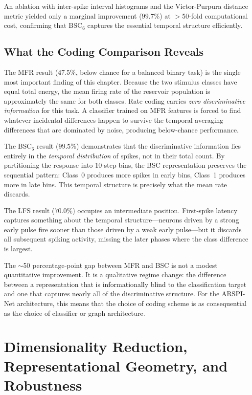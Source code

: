 An ablation with inter-spike interval histograms and the Victor-Purpura distance metric \cite{victor_purpura_1996} yielded only a marginal improvement ($99.7\%$) at $>$50-fold computational cost, confirming that BSC$_6$ captures the essential temporal structure efficiently.

\subsection{What the Coding Comparison Reveals}

The MFR result ($47.5\%$, below chance for a balanced binary task) is the single most important finding of this chapter. Because the two stimulus classes have equal total energy, the mean firing rate of the reservoir population is approximately the same for both classes. Rate coding carries \emph{zero discriminative information} for this task. A classifier trained on MFR features is forced to find whatever incidental differences happen to survive the temporal averaging---differences that are dominated by noise, producing below-chance performance.

The BSC$_6$ result ($99.5\%$) demonstrates that the discriminative information lies entirely in the \emph{temporal distribution} of spikes, not in their total count. By partitioning the response into 10-step bins, the BSC representation preserves the sequential pattern: Class~0 produces more spikes in early bins, Class~1 produces more in late bins. This temporal structure is precisely what the mean rate discards.

The LFS result ($70.0\%$) occupies an intermediate position. First-spike latency captures something about the temporal structure---neurons driven by a strong early pulse fire sooner than those driven by a weak early pulse---but it discards all subsequent spiking activity, missing the later phases where the class difference is largest.

The $\sim$50 percentage-point gap between MFR and BSC is not a modest quantitative improvement. It is a qualitative regime change: the difference between a representation that is informationally blind to the classification target and one that captures nearly all of the discriminative structure. For the ARSPI-Net architecture, this means that the choice of coding scheme is as consequential as the choice of classifier or graph architecture.


\section{Dimensionality Reduction, Representational Geometry, and Robustness}
\label{sec:pca_robustness}

